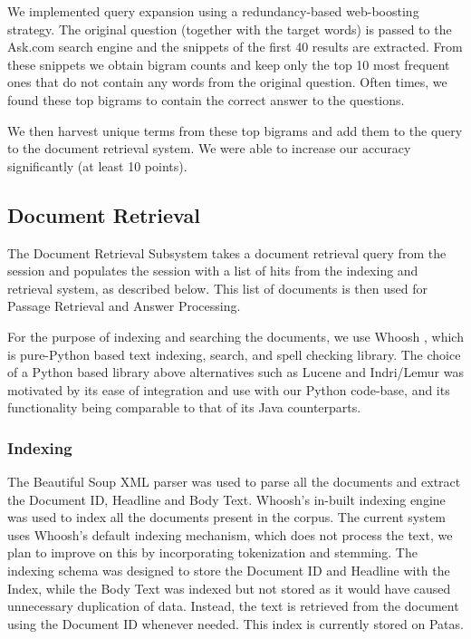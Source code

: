 \documentclass[11pt]{article}
\begin{document}
We implemented query expansion using a redundancy-based web-boosting strategy. The original question (together with the target words) is passed to the Ask.com search engine and the snippets of the first 40 results are extracted. From these snippets we obtain bigram counts and keep only the top 10 most frequent ones that do not contain any words from the original question. Often times, we found these top bigrams to  contain the correct answer to the questions.

We then harvest unique terms from these top bigrams and add them to the query to the document retrieval system. We were able to increase our accuracy significantly (at least 10 points).

\subsection{Document Retrieval}
The Document Retrieval Subsystem takes a document retrieval query from the session and populates the session with a list of hits from the indexing and retrieval system, as described below. This list of documents is then used for Passage Retrieval and Answer Processing.

For the purpose of indexing and searching the documents, we use Whoosh \cite{whoosh}, which is pure-Python based text indexing, search, and spell checking library. The choice of a Python based library above alternatives such as Lucene and Indri/Lemur was motivated by its ease of integration and use with our Python code-base, and its functionality being comparable to that of its Java counterparts.

\subsubsection{Indexing}
The Beautiful Soup XML parser \cite{bsoup} was used to parse all the documents and extract the Document ID, Headline and Body Text. Whoosh's in-built indexing engine was used to index all the documents present in the corpus. The current system uses Whoosh's default indexing mechanism, which does not process the text, we plan to improve on this by incorporating tokenization and stemming. The indexing schema was designed to store the Document ID and Headline with the Index, while the Body Text was indexed but not stored as it would have caused unnecessary duplication of data. Instead, the text is retrieved from the document using the Document ID whenever needed. This index is currently stored on Patas.
\end{document}
